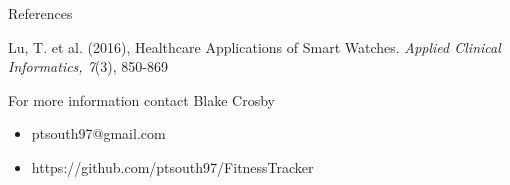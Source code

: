 \documentclass[final]{beamer}
\newlength{\onecolwid}
\begin{document}
\begin{frame}[t]
\begin{columns}[t]
\begin{column}{\onecolwid}
\begin{alertblock}{References}
	\begin{hangparas}{.5in}{1}
		
		Lu, T. et al. (2016), Healthcare Applications of Smart Watches. \textit{Applied Clinical Informatics, 7}(3), 850-869
		
	\end{hangparas}
	
\end{alertblock}


\begin{alertblock}{For more information contact Blake Crosby}

\begin{itemize}
	\item ptsouth97@gmail.com
	\item https://github.com/ptsouth97/FitnessTracker
\end{itemize}

\end{alertblock}



\end{column} %

\end{columns} %

\end{frame} %
\end{document}
